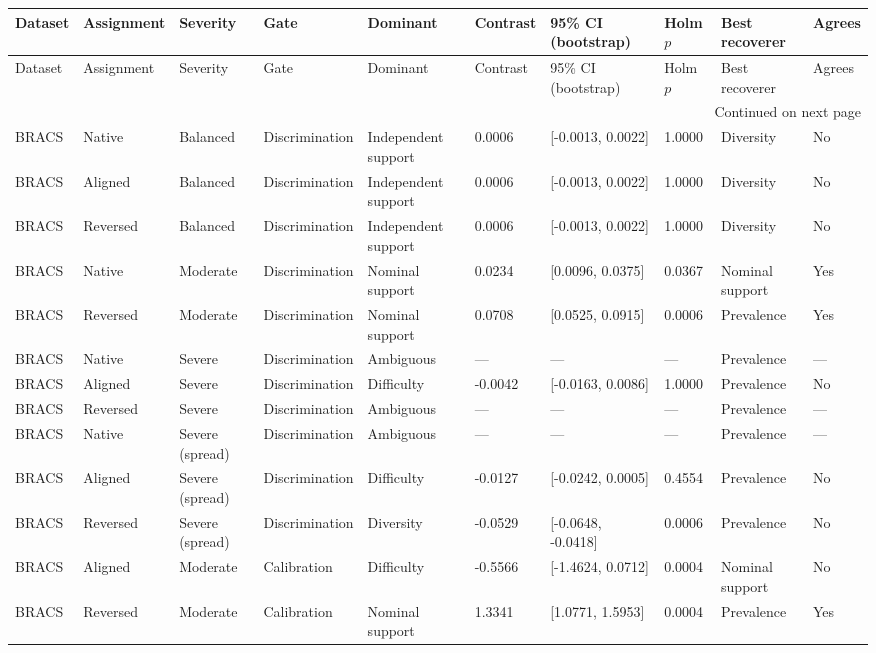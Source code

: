 \begin{longtable}{llllllllll}
\toprule
Dataset & Assignment & Severity & Gate & Dominant & Contrast & 95\% CI (bootstrap) & Holm $p$ & Best recoverer & Agrees \\
\midrule
\endfirsthead
\toprule
Dataset & Assignment & Severity & Gate & Dominant & Contrast & 95\% CI (bootstrap) & Holm $p$ & Best recoverer & Agrees \\
\midrule
\endhead
\midrule
\multicolumn{10}{r}{Continued on next page} \\
\midrule
\endfoot
\bottomrule
\endlastfoot
BRACS & Native & Balanced & Discrimination & Independent support & 0.0006 & [-0.0013, 0.0022] & 1.0000 & Diversity & No \\
BRACS & Aligned & Balanced & Discrimination & Independent support & 0.0006 & [-0.0013, 0.0022] & 1.0000 & Diversity & No \\
BRACS & Reversed & Balanced & Discrimination & Independent support & 0.0006 & [-0.0013, 0.0022] & 1.0000 & Diversity & No \\
BRACS & Native & Moderate & Discrimination & Nominal support & 0.0234 & [0.0096, 0.0375] & 0.0367 & Nominal support & Yes \\
BRACS & Reversed & Moderate & Discrimination & Nominal support & 0.0708 & [0.0525, 0.0915] & 0.0006 & Prevalence & Yes \\
BRACS & Native & Severe & Discrimination & Ambiguous & --- & --- & --- & Prevalence & --- \\
BRACS & Aligned & Severe & Discrimination & Difficulty & -0.0042 & [-0.0163, 0.0086] & 1.0000 & Prevalence & No \\
BRACS & Reversed & Severe & Discrimination & Ambiguous & --- & --- & --- & Prevalence & --- \\
BRACS & Native & Severe (spread) & Discrimination & Ambiguous & --- & --- & --- & Prevalence & --- \\
BRACS & Aligned & Severe (spread) & Discrimination & Difficulty & -0.0127 & [-0.0242, 0.0005] & 0.4554 & Prevalence & No \\
BRACS & Reversed & Severe (spread) & Discrimination & Diversity & -0.0529 & [-0.0648, -0.0418] & 0.0006 & Prevalence & No \\
BRACS & Aligned & Moderate & Calibration & Difficulty & -0.5566 & [-1.4624, 0.0712] & 0.0004 & Nominal support & No \\
BRACS & Reversed & Moderate & Calibration & Nominal support & 1.3341 & [1.0771, 1.5953] & 0.0004 & Prevalence & Yes \\

\end{longtable}
